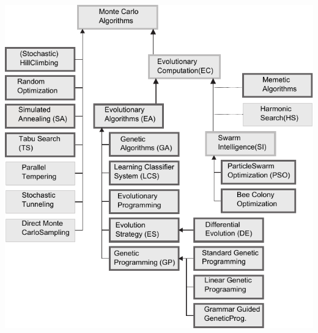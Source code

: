 \documentclass[a4paper,titlepage]{report}
\begin{document}
\newpage
\includegraphics{Images/taxonomy_v2.pdf}
\end{document}
